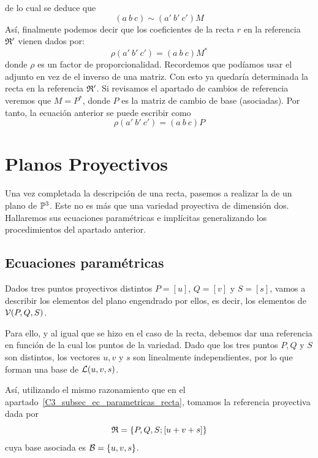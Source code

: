 de lo cual se deduce que
\begin{equation}
	(a \ b \ c)\sim (a' \ b' \ c') M
\end{equation}
Así, finalmente podemos decir que los coeficientes de la recta $r$ en la referencia $\mathfrak{R}'$ vienen dados por:
\begin{equation}
	\rho (a' \ b' \ c')=(a \ b \ c)M^*
\end{equation}
donde $\rho$ es un factor de proporcionalidad. Recordemos que podíamos usar el adjunto en vez de el inverso de una matriz. Con esto ya quedaría determinada la recta en la referencia $\mathfrak{R}'$. Si revisamos el apartado de cambios de referencia veremos que $M=P^*$, donde $P$ es la matriz de cambio de base (asociadas). Por tanto, la ecuación anterior se puede escribir como
\begin{equation}
\rho (a' \ b' \ c')=(a \ b \ c)P
\end{equation}

\section{Planos Proyectivos}\label{C3_sec_planos}

Una vez completada la descripción de una recta, pasemos a realizar la de un plano de $\mathbb{P}^3$. Este no es más que una variedad proyectiva de dimensión dos. Hallaremos sus ecuaciones paramétricas e implícitas generalizando los procedimientos del apartado anterior.

\subsection{Ecuaciones paramétricas}

Dados tres puntos proyectivos distintos $P=[u]$, $Q=[v]$ y $S=[s]$, vamos a describir los elementos del plano engendrado por ellos, es decir, los elementos de $\mathcal{V}(P,Q,S)$. 

Para ello, y al igual que se hizo en el caso de la recta, debemos dar una referencia en función de la cual  los puntos de la variedad. Dado que los tres puntos $P,Q$ y $S$ son distintos, los vectores $u,v$ y $s$ son linealmente independientes, por lo que forman una base de $\mathcal{L}(u,v,s)$.

Así, utilizando el mismo razonamiento que en el apartado~\ref{C3_subsec_ec_parametricas_recta}, tomamos la referencia proyectiva dada por
\[\mathfrak{R}=\{P,Q,S;\left [ u+v+s \right ]\}\]
cuya base asociada es $\mathcal{B}=\{u,v,s\}$.

